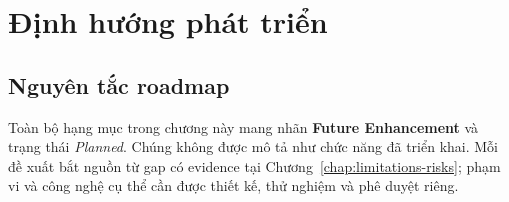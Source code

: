 \chapter{Định hướng phát triển}
\label{chap:future-enhancements}

\section{Nguyên tắc roadmap}

Toàn bộ hạng mục trong chương này mang nhãn \textbf{Future Enhancement} và trạng thái
\textit{Planned}. Chúng không được mô tả như chức năng đã triển khai. Mỗi đề xuất bắt
nguồn từ gap có evidence tại Chương~\ref{chap:limitations-risks}; phạm vi và công nghệ
cụ thể cần được thiết kế, thử nghiệm và phê duyệt riêng.

\begingroup
\small
\setlength{\tabcolsep}{3pt}
